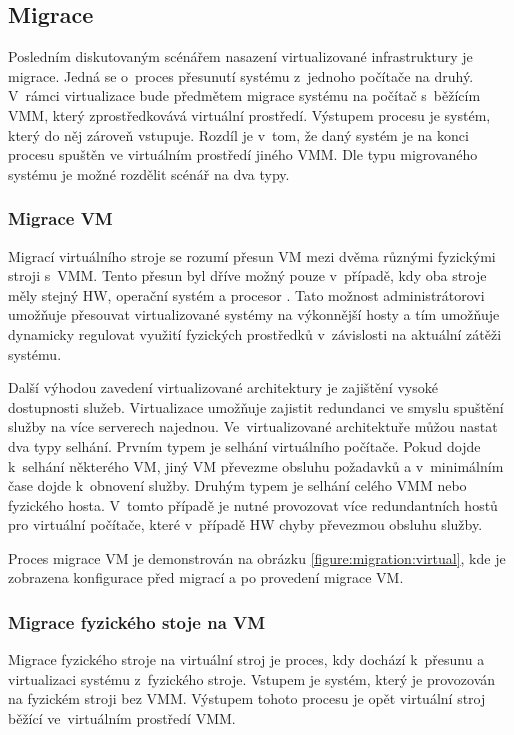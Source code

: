 \subsection{Migrace}
\label{chapter:virtualization:deployment:migration}
Posledním diskutovaným scénářem nasazení virtualizované infrastruktury je migrace. Jedná se o~proces přesunutí systému z~jednoho
počítače na druhý. V~rámci virtualizace bude předmětem migrace systému na počítač s~běžícím VMM, který zprostředkovává
virtuální prostředí. Výstupem procesu je systém, který do něj zároveň vstupuje. Rozdíl je v~tom, že daný systém je na konci procesu
spuštěn ve virtuálním prostředí jiného VMM. Dle typu migrovaného systému je možné rozdělit scénář na dva typy.
\subsubsection{Migrace VM}
\label{chapter:virtualization:deployment:migration:virtual}
Migrací virtuálního stroje se rozumí přesun VM mezi dvěma různými fyzickými stroji s~VMM. Tento přesun byl dříve možný pouze
v~případě, kdy oba stroje měly stejný HW, operační systém a procesor \cite{oracle:virtualization:reasons}. Tato možnost administrátorovi
umožňuje přesouvat virtualizované systémy na výkonnější hosty a tím umožňuje dynamicky regulovat využití fyzických prostředků
v~závislosti na aktuální zátěži systému.

Další výhodou zavedení virtualizované architektury je zajištění vysoké dostupnosti služeb. Virtualizace umožňuje zajistit 
redundanci ve smyslu spuštění služby na více serverech najednou. Ve~virtualizované architektuře můžou nastat dva typy selhání.
Prvním typem je selhání virtuálního počítače. Pokud dojde k~selhání některého VM, jiný VM převezme obsluhu požadavků a
v~minimálním čase dojde k~obnovení služby. Druhým typem je selhání celého VMM nebo fyzického hosta. V~tomto případě je nutné
provozovat více redundantních hostů pro virtuální počítače, které v~případě HW chyby převezmou obsluhu služby.

Proces migrace VM je demonstrován na obrázku \ref{figure:migration:virtual}, kde je zobrazena konfigurace před migrací
a po provedení migrace VM.
\subsubsection{Migrace fyzického stoje na VM}
\label{chapter:virtualization:deployment:migration:physical}
Migrace fyzického stroje na virtuální stroj je proces, kdy dochází k~přesunu a virtualizaci systému z~fyzického stroje.
Vstupem je systém, který je provozován na fyzickém stroji bez VMM. Výstupem tohoto procesu je opět virtuální stroj běžící
ve~virtuálním prostředí VMM.

